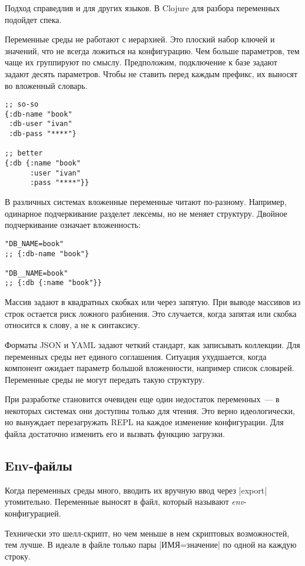 Подход справедлив и для других языков. В Clojure для разбора переменных подойдет
спека.

Переменные среды не работают с иерархией. Это плоский набор ключей и значений,
что не всегда ложиться на конфигурацию. Чем больше параметров, тем чаще их
группируют по смыслу. Предположим, подключение к базе задают задают десять
параметров. Чтобы не ставить перед каждым префикс, их выносят во вложенный
словарь.

\begin{verbatim}
;; so-so
{:db-name "book"
 :db-user "ivan"
 :db-pass "****"}

;; better
{:db {:name "book"
      :user "ivan"
      :pass "****"}}
\end{verbatim}

В различных системах вложенные переменные читают по-разному. Например, одинарное
подчеркивание разделет лексемы, но не меняет структуру. Двойное подчеркивание
означает вложенность:

\begin{verbatim}
"DB_NAME=book"
;; {:db-name "book"}

"DB__NAME=book"
;; {:db {:name "book"}}
\end{verbatim}

Массив задают в квадратных скобках или через запятую. При выводе массивов из
строк остается риск ложного разбиения. Это случается, когда запятая или скобка
относится к слову, а не к синтаксису.

Форматы JSON и YAML задают четкий стандарт, как записывать коллекции. Для
переменных среды нет единого соглашения. Ситуация ухудшается, когда компонент
ожидает параметр большой вложенности, например список словарей. Переменные среды
не могут передать такую структуру.

При разработке становится очевиден еще один недостаток переменных~--- в
некоторых системах они доступны только для чтения. Это верно идеологически, но
вынуждает перезагружать REPL на каждое изменение конфигурации. Для файла
достаточно изменить его и вызвать функцию загрузки.

\subsection{Env-файлы}

Когда переменных среды много, вводить их вручную ввод через \spverb|export|
утомительно. Переменные выносят в файл, который называют
\emph{env}-конфигурацией.

Технически это шелл-скрипт, но чем меньше в нем скриптовых возможностей, тем
лучше. В идеале в файле только пары \spverb|ИМЯ=значение| по одной на каждую
строку.

